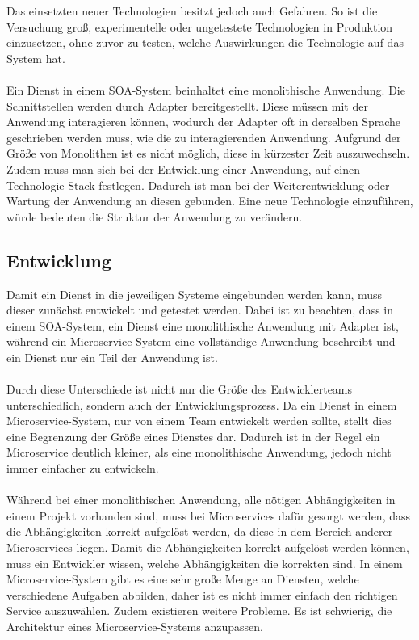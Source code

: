 Das einsetzten neuer Technologien besitzt jedoch auch Gefahren. So ist die Versuchung groß, experimentelle oder ungetestete Technologien in Produktion einzusetzen, ohne zuvor zu testen, welche Auswirkungen die Technologie auf das System hat.
\\\\
Ein Dienst in einem SOA-System beinhaltet eine monolithische Anwendung. Die Schnittstellen werden durch Adapter bereitgestellt. Diese müssen mit der Anwendung interagieren können, wodurch der Adapter oft in derselben Sprache geschrieben werden muss, wie die zu interagierenden Anwendung. Aufgrund der Größe von Monolithen ist es nicht möglich, diese in kürzester Zeit auszuwechseln. Zudem muss man sich bei der Entwicklung einer Anwendung, auf einen Technologie Stack festlegen. Dadurch ist man bei der Weiterentwicklung oder Wartung der Anwendung an diesen gebunden. Eine neue Technologie einzuführen, würde bedeuten die Struktur der Anwendung zu verändern.

\subsection{Entwicklung}
\label{subsec:Entwicklung}
Damit ein Dienst in die jeweiligen Systeme eingebunden werden kann, muss dieser zunächst entwickelt und getestet werden. Dabei ist zu beachten, dass in einem SOA-System, ein Dienst eine monolithische Anwendung mit Adapter ist, während ein Microservice-System eine vollständige Anwendung beschreibt und ein Dienst nur ein Teil der Anwendung ist.
\\\\
Durch diese Unterschiede ist nicht nur die Größe des Entwicklerteams unterschiedlich, sondern auch der Entwicklungsprozess. Da ein Dienst in einem Microservice-System, nur von einem Team entwickelt werden sollte, stellt dies eine Begrenzung der Größe eines Dienstes dar. Dadurch ist in der Regel ein Microservice deutlich kleiner, als eine monolithische Anwendung, jedoch nicht immer einfacher zu entwickeln.
\\\\
Während bei einer monolithischen Anwendung, alle nötigen Abhängigkeiten in einem Projekt vorhanden sind, muss bei Microservices dafür gesorgt werden, dass die Abhängigkeiten korrekt aufgelöst werden, da diese in dem Bereich anderer Microservices  liegen. Damit die Abhängigkeiten korrekt aufgelöst werden können, muss ein Entwickler wissen, welche Abhängigkeiten die korrekten sind. In einem Microservice-System gibt es eine sehr große Menge an Diensten, welche verschiedene Aufgaben abbilden, daher ist es nicht immer einfach den richtigen Service auszuwählen. Zudem existieren weitere Probleme. Es ist schwierig, die Architektur eines Microservice-Systems anzupassen.

